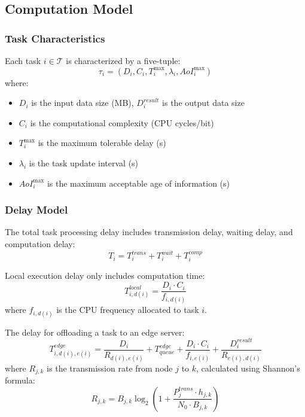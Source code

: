 \documentclass[conference]{IEEEtran}
\begin{document}
\subsection{Computation Model}
\subsubsection{Task Characteristics}
Each task $i \in \mathcal{T}$ is characterized by a five-tuple:
\begin{equation}
\tau_i = (D_i, C_i, T_i^{\max}, \lambda_i, AoI_i^{\max})
\end{equation}
where:
\begin{itemize}
    \item $D_i$ is the input data size (MB), $D_i^{result}$ is the output data size
    \item $C_i$ is the computational complexity (CPU cycles/bit)
    \item $T_i^{\max}$ is the maximum tolerable delay (s)
    \item $\lambda_i$ is the task update interval (s)
    \item $AoI_i^{\max}$ is the maximum acceptable age of information (s)
\end{itemize}

\subsubsection{Delay Model}
The total task processing delay includes transmission delay, waiting delay, and computation delay:
\begin{equation}
T_i = T_i^{trans} + T_i^{wait} + T_i^{comp}
\end{equation}

Local execution delay only includes computation time:
\begin{equation}
T_{i,d(i)}^{local} = \frac{D_i \cdot C_i}{f_{i,d(i)}}
\end{equation}
where $f_{i,d(i)}$ is the CPU frequency allocated to task $i$.

The delay for offloading a task to an edge server:
\begin{equation}
T_{i,d(i),e(i)}^{edge} = \frac{D_i}{R_{d(i),e(i)}} + T_{queue}^{edge} + \frac{D_i \cdot C_i}{f_{i,e(i)}} + \frac{D_i^{result}}{R_{e(i),d(i)}}
\end{equation}
where $R_{j,k}$ is the transmission rate from node $j$ to $k$, calculated using Shannon's formula:
\begin{equation}
R_{j,k} = B_{j,k} \log_2\left(1 + \frac{P_j^{trans} \cdot h_{j,k}}{N_0 \cdot B_{j,k}}\right)
\end{equation}
\end{document}
